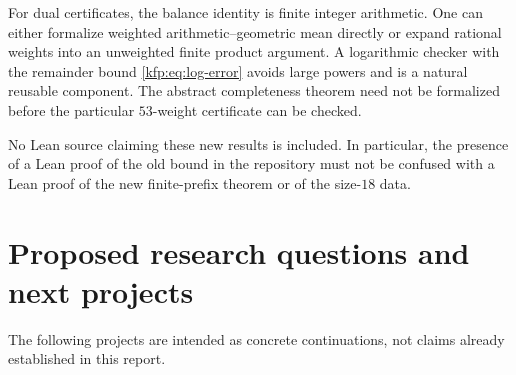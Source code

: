 \documentclass[11pt,a4paper]{article}
\theoremstyle{definition}
\theoremstyle{remark}
\begin{document}
For dual certificates, the balance identity is finite integer arithmetic.
One can either formalize weighted arithmetic--geometric mean directly or
expand rational weights into an unweighted finite product argument. A
logarithmic checker with the remainder bound \eqref{kfp:eq:log-error} avoids
large powers and is a natural reusable component. The abstract completeness
theorem need not be formalized before the particular $53$-weight certificate
can be checked.

No Lean source claiming these new results is included. In particular, the
presence of a Lean proof of the old bound in the repository must not be
confused with a Lean proof of the new finite-prefix theorem or of the
size-$18$ data.

\section{Proposed research questions and next projects}
\label{kfp:sec:questions}

The following projects are intended as concrete continuations, not claims
already established in this report.
\end{document}
